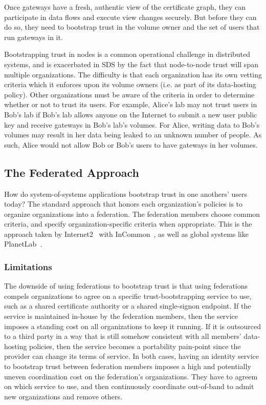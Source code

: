 Once gateways have a fresh, authentic view of the certificate graph, they can
participate in data flows and execute view changes securely.  But before they
can do so, they need to bootstrap trust in the volume owner and the set of users
that run gateways in it.

Bootstrapping trust in nodes is a common operational challenge in
distributed systems, and is exacerbated in SDS by the fact that node-to-node
trust will span multiple organizations.
The difficulty is that each organization has its own vetting criteria which it
enforces upon its volume owners (i.e. as part of its data-hosting policy).
Other organizations must be aware of the criteria in order to determine
whether or not to trust its users.  For example, Alice's lab may
not trust users in Bob's lab if Bob's lab allows anyone on the Internet
to submit a new user public key and receive gateways in Bob's
lab's volumes.  For Alice, writing data to Bob's volumes may result in her data
being leaked to an unknown number of people.  As such, Alice would not allow Bob
or Bob's users to have gateways in her volumes.

\subsection{The Federated Approach}

How do system-of-systems applications bootstrap trust in one anothers' users
today?  The standard approach that honors each organization's policies is to organize
organizations into a federation.  The federation members choose common criteria,
and specify organization-specific criteria when appropriate.  This is the
approach taken by Internet2~\cite{internet2} with InCommon~\cite{incommon}, as
well as global systems like PlanetLab~\cite{planet-lab}.

\subsubsection{Limitations}

The downside of using federations to bootstrap trust is that using federations compels
organizations to agree on a specific trust-bootstrapping service to use, such as
a shared certificate authority or a shared single-signon endpoint.  If the
service is maintained in-house by the
federation members, then the service imposes a standing cost on all organizations to keep it
running.  If it is outsourced to a third party in a way that is still somehow
consistent with all members' data-hosting policies, then the service becomes a portability
pain-point since the provider can change its terms of service.  In both cases,
having an identity service to bootstrap trust between federation members imposes
a high and potentially uneven coordination cost on the federation's organizations.
They have to agreem on which service to use, and then continuously
coordinate out-of-band to admit new organizations and remove others.


